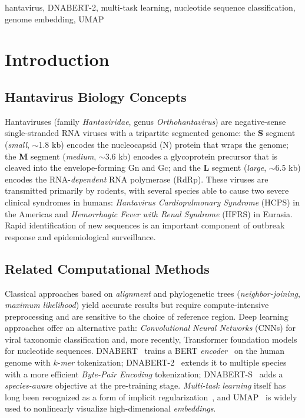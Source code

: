 \documentclass[conference]{IEEEtran}
\begin{document}
\begin{IEEEkeywords}
hantavirus, DNABERT-2, multi-task learning, nucleotide sequence
classification, genome embedding, UMAP
\end{IEEEkeywords}

\section{Introduction}\label{sec:intro}

\subsection{Hantavirus Biology Concepts}

Hantaviruses (family \emph{Hantaviridae}, genus \emph{Orthohantavirus})
are negative-sense single-stranded RNA viruses with a tripartite
segmented genome: the \textbf{S} segment (\emph{small}, $\sim$1{.}8 kb)
encodes the nucleocapsid (N) protein that wraps the genome; the
\textbf{M} segment (\emph{medium}, $\sim$3{.}6 kb) encodes a glycoprotein
precursor that is cleaved into the envelope-forming Gn and Gc; and the
\textbf{L} segment (\emph{large}, $\sim$6{.}5 kb) encodes the
RNA-\emph{dependent} RNA polymerase (RdRp). These viruses are transmitted
primarily by rodents, with several species able to cause two severe
clinical syndromes in humans:
\emph{Hantavirus Cardiopulmonary Syndrome} (HCPS) in the Americas and
\emph{Hemorrhagic Fever with Renal Syndrome} (HFRS) in Eurasia.
Rapid identification of new sequences is an important component of
outbreak response and epidemiological surveillance.

\subsection{Related Computational Methods}

Classical approaches based on \emph{alignment} and phylogenetic trees
(\emph{neighbor-joining}, \emph{maximum likelihood}) yield accurate
results but require compute-intensive preprocessing and are sensitive to
the choice of reference region. Deep learning approaches offer an
alternative path: \emph{Convolutional Neural Networks} (CNNs) for viral
taxonomic classification and, more recently, Transformer foundation
models for nucleotide sequences. \textsc{DNABERT}~\cite{Ji2021DNABERT}
trains a BERT \emph{encoder}~\cite{Devlin2019BERT} on the human genome
with $k$-\emph{mer} tokenization;
\textsc{DNABERT-2}~\cite{Zhou2023DNABERT2} extends it to multiple species
with a more efficient \emph{Byte-Pair Encoding} tokenization;
\textsc{DNABERT-S}~\cite{Zhou2024DNABERTS} adds a \emph{species-aware}
objective at the pre-training stage. \emph{Multi-task learning} itself has
long been recognized as a form of implicit
regularization~\cite{Caruana1997MTL}, and
\textsc{UMAP}~\cite{McInnes2018UMAP} is widely used to nonlinearly
visualize high-dimensional \emph{embeddings}.
\end{document}
